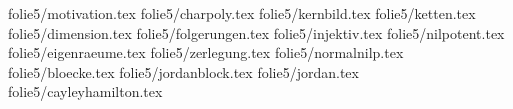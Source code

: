 %
%
%
folie{5/motivation.tex}
folie{5/charpoly.tex}
folie{5/kernbild.tex}
folie{5/ketten.tex}
folie{5/dimension.tex}
folie{5/folgerungen.tex}
folie{5/injektiv.tex}
folie{5/nilpotent.tex}
folie{5/eigenraeume.tex}
folie{5/zerlegung.tex}
folie{5/normalnilp.tex}
folie{5/bloecke.tex}
folie{5/jordanblock.tex}
folie{5/jordan.tex}
folie{5/cayleyhamilton.tex}
